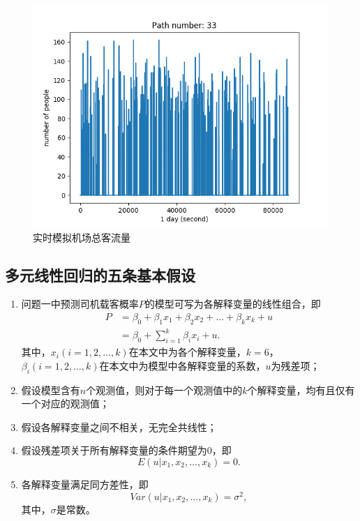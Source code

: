 \begin{figure}
    \centering
    \includegraphics[width=.7\textwidth]{figures/航空客流量.png}
    \caption{实时模拟机场总客流量}\label{fig:航空客流量}
\end{figure}


\subsection{多元线性回归的五条基本假设}
\begin{enumerate}
    \item 问题一中预测司机载客概率$P$的模型可写为各解释变量的线性组合，即
        \begin{align*}
            P &= \beta_0 + \beta_1x_1 + \beta_2x_2 + \dots + \beta_kx_k + u \\
              &= \beta_0 + \sum_{i=1}^{k} \beta_ix_i + u.
        \end{align*}
        其中，$x_i (i=1,2,\ldots,k)$在本文中为各个解释变量，$k=6$，$\beta_i(i=1,2,\ldots,k)$在本文中为模型中各解释变量的系数，$u$为残差项；

    \item 假设模型含有$n$个观测值，则对于每一个观测值中的$k$个解释变量，均有且仅有一个对应的观测值；

    \item 假设各解释变量之间不相关，无完全共线性；

    \item 假设残差项关于所有解释变量的条件期望为0，即
        \[
            E(u|x_1,x_2,\ldots,x_k) = 0.
        \]

     \item 各解释变量满足同方差性，即
        \[
            Var(u|x_1,x_2,\dots,x_k) = \sigma^2,
        \]
        其中，$\sigma$是常数。
\end{enumerate}


